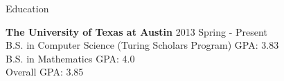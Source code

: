 \documentclass{resume} %
\begin{document}

\begin{rSection}{Education}

{\bf The University of Texas at Austin} \hfill {2013 Spring - Present} \\ 
B.S. in Computer Science (Turing Scholars Program) \hfill {GPA: 3.83} \\
B.S. in  Mathematics \hfill {GPA: 4.0} \\
Overall GPA: 3.85
\end{rSection}




\end{document}
